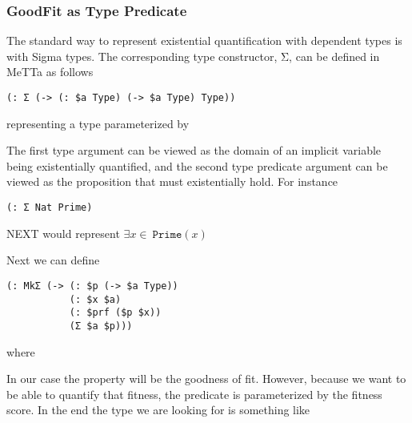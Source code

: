 \documentclass[]{report}
\begin{document}
\subsubsection{GoodFit as Type Predicate}

The standard way to represent existential quantification with
dependent types is with Sigma types.  The corresponding type
constructor, Σ, can be defined in MeTTa as follows
\begin{verbatim}
(: Σ (-> (: $a Type) (-> $a Type) Type))
\end{verbatim}
representing a type parameterized by
The first type argument can be viewed as the domain of an implicit
variable being existentially quantified, and the second type predicate
argument can be viewed as the proposition that must existentially
hold.  For instance
\begin{verbatim}
(: Σ Nat Prime)
\end{verbatim}
NEXT would represent $\exists x\in \ \texttt{Prime}(x)$

Next we can define
\begin{verbatim}
(: MkΣ (-> (: $p (-> $a Type))
           (: $x $a)
           (: $prf ($p $x))
           (Σ $a $p)))
\end{verbatim}
where
In our case the property will be the goodness of fit.  However,
because we want to be able to quantify that fitness, the predicate is
parameterized by the fitness score.  In the end the type we are
looking for is something like
\end{document}
